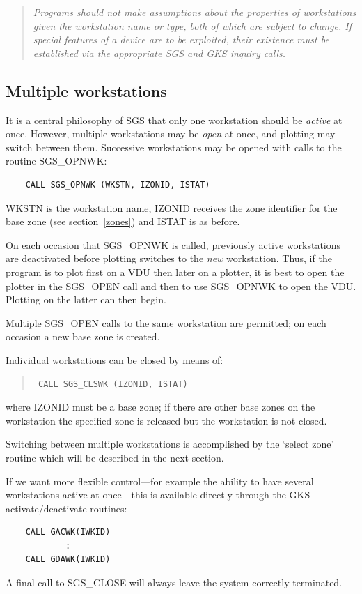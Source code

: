 \documentclass[11pt]{article}
\newcommand{\hyperref}[4]{#2\ref{#4}#3}
\newcommand{\htmlref}[2]{#1}
\begin{document}
\begin{quote}
{\em Programs should not make assumptions about the properties
of workstations given the workstation name or type, both of which are subject
to change.  If special features of a device are to be exploited, their
existence must be established via the appropriate SGS and GKS inquiry calls.}
\end{quote}

\subsection {Multiple workstations}\label{sec-mult-ws}

It is a central philosophy of SGS that only one workstation should be
{\em active}\/ at once.
However, multiple workstations may be {\em open}\/ at once, and plotting may
switch between them.
Successive workstations may be opened with calls to the routine
\htmlref{SGS\_OPNWK}{SGS_OPNWK}:
\begin{verbatim}
    CALL SGS_OPNWK (WKSTN, IZONID, ISTAT)
\end{verbatim}
WKSTN is the
\htmlref{workstation name}{sec-op-cl}, IZONID receives the zone
identifier for the base zone (see
\hyperref{this section}{section~}{}{zones}) and ISTAT is as before.

On each occasion that SGS\_OPNWK is called, previously
active workstations are deactivated before plotting switches
to the {\em new}\/ workstation.  Thus, if the program is to plot
first on a VDU then later on a plotter, it is best to open the
plotter in the \htmlref{SGS\_OPEN}{SGS_OPEN}
call and then to use SGS\_OPNWK to open
the VDU.  Plotting on the latter can then begin.

Multiple SGS\_OPEN calls to the same workstation are permitted;  on
each occasion a new base zone is created.

Individual workstations can be closed by means of:
\begin{quote}{\tt
    CALL \htmlref{SGS\_CLSWK}{SGS_CLSWK} (IZONID, ISTAT)}
\end{quote}
where IZONID must be a base zone; if there are other base zones on the
workstation the specified zone is released but the workstation is not closed.

Switching between multiple workstations is accomplished by the `select
zone' routine which will be described in the
\htmlref{next}{zones} section.

If we want more flexible control---for example the ability to have several
workstations active at once---this is available
directly through the GKS activate/deactivate routines:
\begin{verbatim}
    CALL GACWK(IWKID)
            :
    CALL GDAWK(IWKID)
\end{verbatim}
A final call to \htmlref{SGS\_CLOSE}{SGS_CLOSE}
will always leave the system correctly terminated.
\end{document}
